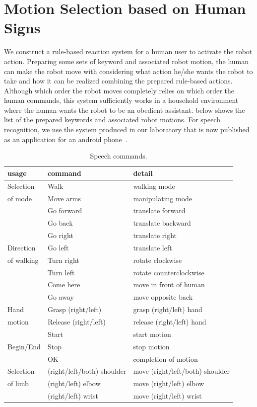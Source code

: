 \section{Motion Selection based on Human Signs}
\label{sec:aural}
We construct a rule-based reaction system for a human user to activate the robot action. Preparing some sets of keyword and associated robot motion, the human can make the robot move with considering what action he/she wants the robot to take and how it can be realized combining the prepared rule-based actions. Although which order the robot moves completely relies on which order the human commands, this system sufficiently works in a household environment where the human wants the robot to be an obedient assistant.  below shows the list of the prepared keywords and associated robot motions. For speech recognition, we use the system produced in our laboratory that is now published as an application for an android phone~\cite{ros_voice_message}.

\begin{table}[htbp]
  \begin{center}
    \caption{Speech commands.}
    \begin{tabular}{|l|l|l|} \hline
      usage & command & detail \\ \hline\hline
      Selection & Walk & walking mode \\
      of mode & Move arms & manipulating mode \\ \hline
      & Go forward & translate forward \\
      & Go back & translate backward \\
      & Go right & translate right\\
      Direction & Go left & translate left\\
      of walking & Turn right & rotate clockwise \\
      & Turn left & rotate counterclockwise \\
      & Come here & move in front of human \\
      & Go away & move opposite back \\ \hline
      Hand & Grasp (right/left) & grasp (right/left) hand \\
      motion & Release (right/left) & release (right/left) hand \\ \hline
      & Start & start motion \\
      Begin/End & Stop & stop motion \\
      & OK & completion of motion \\ \hline
      Selection & (right/left/both) shoulder & move (right/left/both) shoulder\\
      of limb & (right/left) elbow & move (right/left) elbow\\
      & (right/left) wrist & move (right/left) wrist\\ \hline
    \end{tabular}
    \label{table:speech_command}
  \end{center}
\end{table}

